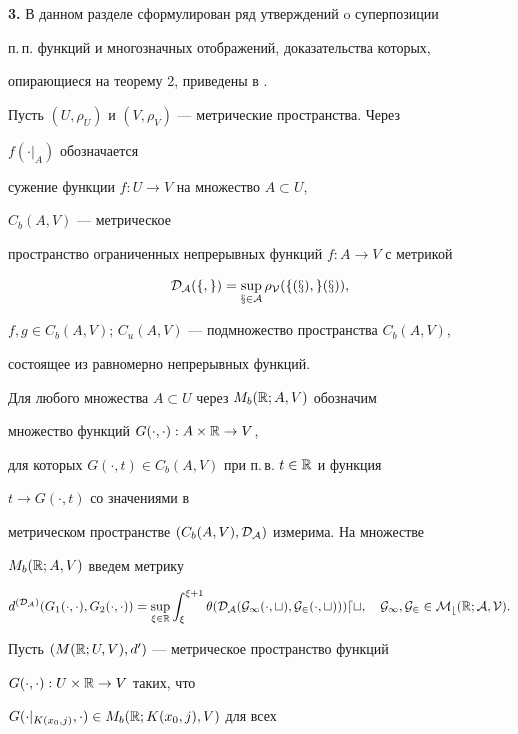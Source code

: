 {\bf 3.} В данном разделе сформулирован ряд утверждений o суперпозиции


п.\,п. функций и многозначных отображений, доказательства которых,


опирающиеся на теорему 2, приведены в \cite{10}.





Пусть $(U,\rho_U)$ и $(V,\rho_V)$ --- метрические пространства. Через


$f(\cdot|_A)$ обозначается


сужение функции $f:U\to V$ на множество $A\subset U$,


$C_b(A,V)$ --- метрическое


пространство ограниченных непрерывных функций $f:A\to V$ с метрикой


$$


\cal D_A(f,g)=\sup_{x\in A}\rho_V(f(x),g(x)),


$$


$f,g\in C_b(A,V)$; $C_u(A,V)$ --- подмножество пространства $C_b(A,V)$,


состоящее из равномерно непрерывных функций.





Для любого множества $A\subset U$ через $M_b(\Bbb R;A,V)$ обозначим


множество функций $G(\cdot,\cdot):A\times\Bbb R\to V$,


для которых $G(\cdot,t)\in C_b(A,V)$ при п.\,в. $t\in\Bbb R$ и функция


$t\to G(\cdot,t)$ со значениями в


метрическом пространстве $(C_b(A,V),\cal D_A)$ измерима. На множестве


$M_b(\Bbb R;A,V)$ введем метрику


$$


d^{(\cal D_A)}(G_1(\cdot,\cdot),G_2(\cdot,\cdot))=


\sup_{\xi\in\Bbb R}\int^{\xi+1}_\xi \theta(\cal D_A(G_1(\cdot,t),


G_2(\cdot,t)))dt, \quad G_1,G_2\in M_b(\Bbb R;A,V).


$$





Пусть $(M(\Bbb R;U,V),d')$ --- метрическое пространство функций


$G(\cdot,\cdot):U\times\Bbb R\to V$ таких, что


$G(\cdot|_{K(x_0,j)},\cdot)\in M_b(\Bbb R;K(x_0,j),V)$ для всех


